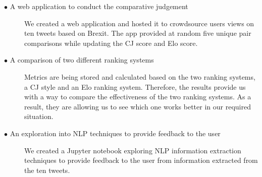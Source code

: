 \begin{description}	
	
	\item[\(\bullet\) A web application to conduct the comparative judgement]\hfill
	
	We created a web application and hosted it to crowdsource users views on ten tweets based on Brexit. The app provided at random five unique pair comparisons while updating the CJ score and Elo score. 
	
	\item[\(\bullet\) A comparison of two different ranking systems]\hfill
	
	Metrics are being stored and calculated based on the two ranking systems, a CJ style and an Elo ranking system. Therefore, the results provide us with a way to compare the effectiveness of the two ranking systems. As a result, they are allowing us to see which one works better in our required situation.
	
	\item[\(\bullet\) An exploration into NLP techniques to provide feedback to the user]\hfill
	
	We created a Jupyter notebook exploring NLP information extraction techniques to provide feedback to the user from information extracted from the ten tweets.
	
\end{description}









